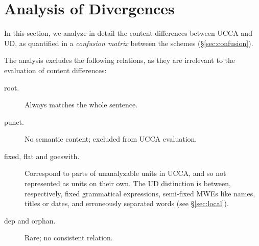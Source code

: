 \documentclass[11pt,a4paper]{article}
\begin{document}
\section{Analysis of Divergences}\label{sec:analysis}

In this section, we analyze in detail the content differences between UCCA and UD,
as quantified in a \textit{confusion matrix} between the schemes (\S\ref{sec:confusion}).

The analysis excludes the following relations,
as they are irrelevant to the evaluation of content differences:

\begin{description}
  \item[root.] Always matches the whole sentence.
  \item[punct.] No semantic content; excluded from UCCA evaluation.
  \item[fixed, flat and goeswith.] Correspond to parts of unanalyzable units in UCCA,
  and so not represented as units on their own.
  The UD distinction is between, respectively, fixed grammatical expressions,
  semi-fixed MWEs like names, titles or dates, and erroneously separated words (see \S\ref{sec:local}).
  \item[dep and orphan.] Rare; no consistent relation.
\end{description}
\end{document}
